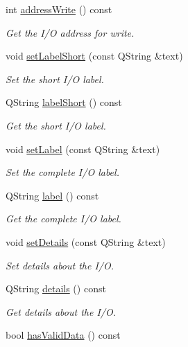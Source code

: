 \begin{DoxyCompactItemize}
int \hyperlink{classmdt_abstract_io_aa62d29a8f8f97b3c8e382ad608048ab4}{address\-Write} () const 
\begin{DoxyCompactList}\small\item\em Get the I/\-O address for write. \end{DoxyCompactList}\item 
void \hyperlink{classmdt_abstract_io_a0f0a70927942f793ce93c7f0c013a39e}{set\-Label\-Short} (const Q\-String \&text)
\begin{DoxyCompactList}\small\item\em Set the short I/\-O label. \end{DoxyCompactList}\item 
Q\-String \hyperlink{classmdt_abstract_io_ad6490f8dda6df55cc3d1811348d0155e}{label\-Short} () const 
\begin{DoxyCompactList}\small\item\em Get the short I/\-O label. \end{DoxyCompactList}\item 
void \hyperlink{classmdt_abstract_io_ae614f78829c59cb7b7d8265dd59e2164}{set\-Label} (const Q\-String \&text)
\begin{DoxyCompactList}\small\item\em Set the complete I/\-O label. \end{DoxyCompactList}\item 
Q\-String \hyperlink{classmdt_abstract_io_a8d21d147ce526f9ad9f65bde7c68b7d9}{label} () const 
\begin{DoxyCompactList}\small\item\em Get the complete I/\-O label. \end{DoxyCompactList}\item 
void \hyperlink{classmdt_abstract_io_a9844c14b0e64858c62604039681ab885}{set\-Details} (const Q\-String \&text)
\begin{DoxyCompactList}\small\item\em Set details about the I/\-O. \end{DoxyCompactList}\item 
Q\-String \hyperlink{classmdt_abstract_io_a6e0b36f1563a045a23417145290fdf41}{details} () const 
\begin{DoxyCompactList}\small\item\em Get details about the I/\-O. \end{DoxyCompactList}\item 
bool \hyperlink{classmdt_abstract_io_a61d96045087fe92a0b455693970b1e76}{has\-Valid\-Data} () const 

\end{DoxyCompactItemize}
